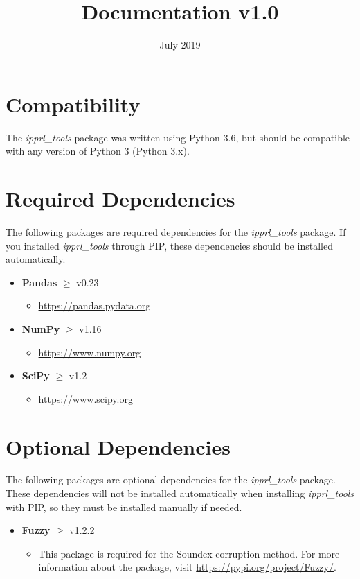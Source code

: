 \documentclass[titlepage, 11pt]{article}
\title{\pkgname{} Documentation v1.0}
\date{July 2019}
\newcommand{\pkgname}{\textit{ipprl\_tools}}
\begin{document}
\maketitle

\tableofcontents
\section{Compatibility}
The \pkgname{} package was written using Python 3.6, but should be compatible with any version of Python 3 (Python 3.x).

\section{Required Dependencies}
The following packages are required dependencies for the \pkgname{} package. If you installed \pkgname{} through PIP, these dependencies should be installed automatically.

    \begin{itemize}
        \item \textbf{Pandas} $\geq$ v0.23
        \begin{itemize}
            \item \url{https://pandas.pydata.org}
        \end{itemize}
        \item \textbf{NumPy} $\geq$ v1.16
        \begin{itemize}
            \item \url{https://www.numpy.org}
        \end{itemize}
        \item \textbf{SciPy} $\geq$ v1.2
        \begin{itemize}
            \item \url{https://www.scipy.org}
        \end{itemize}
    \end{itemize}

\section{Optional Dependencies}
The following packages are optional dependencies for the \pkgname{} package. These dependencies will not be installed automatically when installing \pkgname{} with PIP, so they must be installed manually if needed.

\begin{itemize}
    \item \textbf{Fuzzy} $\geq$ v1.2.2
    \begin{itemize}
        \item This package is required for the Soundex corruption method. For more information about the package, visit \url{https://pypi.org/project/Fuzzy/}.
    \end{itemize}
\end{itemize}
\end{document}
